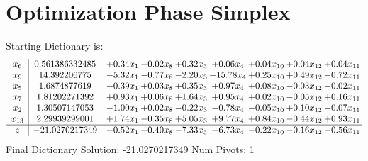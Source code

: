 \documentclass[9pt]{article}
\begin{document}
\section{Optimization Phase Simplex}
Starting Dictionary is:
\[\begin{array}{c| c c@{\hskip 2pt} c@{\hskip 2pt} c@{\hskip 2pt} c@{\hskip 2pt} c@{\hskip 2pt} c@{\hskip 2pt} c@{\hskip 2pt} }
 x_{6}   &  0.561386332485 & +  0.34 x_{1} & -0.02 x_{8} & +  0.32 x_{3} & +  0.06 x_{4} & +  0.04 x_{10} & +  0.04 x_{12} & +  0.04 x_{11}\\
 x_{9}   &  14.392206775 & -5.32 x_{1} & -0.77 x_{8} & -2.20 x_{3} & -15.78 x_{4} & +  0.25 x_{10} & +  0.49 x_{12} & -0.72 x_{11}\\
 x_{5}   &  1.6874877619 & -0.39 x_{1} & +  0.03 x_{8} & +  0.35 x_{3} & +  0.97 x_{4} & +  0.08 x_{10} & -0.03 x_{12} & -0.02 x_{11}\\
 x_{7}   &  1.81202271392 & +  0.93 x_{1} & +  0.06 x_{8} & +  1.64 x_{3} & +  0.95 x_{4} & +  0.02 x_{10} & -0.05 x_{12} & +  0.16 x_{11}\\
 x_{2}   &  1.30507147053 & -1.00 x_{1} & +  0.02 x_{8} & -0.22 x_{3} & -0.78 x_{4} & -0.05 x_{10} & +  0.10 x_{12} & -0.07 x_{11}\\
 x_{13}   &  2.29939299001 & +  1.74 x_{1} & -0.35 x_{8} & +  5.05 x_{3} & +  9.77 x_{4} & +  0.84 x_{10} & -0.44 x_{12} & +  0.93 x_{11}\\
\hline
z    &  -21.0270217349 & -0.52 x_{1} & -0.40 x_{8} & -7.33 x_{3} & -6.73 x_{4} & -0.22 x_{10} & -0.16 x_{12} & -0.56 x_{11}\\
\end{array}\]
Final Dictionary
Solution:  -21.0270217349
Num Pivots:  1
\end{document}
